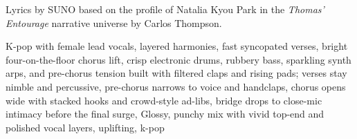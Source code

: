 
\begin{notes}
Lyrics by SUNO based on the profile of Natalia Kyou Park in the \emph{Thomas’ Entourage} narrative universe by Carlos Thompson.
\end{notes}
\begin{style}
K-pop with female lead vocals, layered harmonies, fast syncopated verses, bright four-on-the-floor chorus lift, crisp electronic drums, rubbery bass, sparkling synth arps, and pre-chorus tension built with filtered claps and rising pads; verses stay nimble and percussive, pre-chorus narrows to voice and handclaps, chorus opens wide with stacked hooks and crowd-style ad-libs, bridge drops to close-mic intimacy before the final surge, Glossy, punchy mix with vivid top-end and polished vocal layers, uplifting, k-pop
\end{style}
